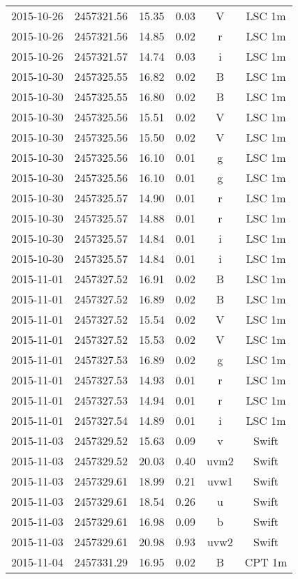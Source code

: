 \begin{table}
\begin{tabular}{cccccc}
2015-10-26 & 2457321.56 & 15.35 & 0.03 & V & LSC 1m \\
2015-10-26 & 2457321.56 & 14.85 & 0.02 & r & LSC 1m \\
2015-10-26 & 2457321.57 & 14.74 & 0.03 & i & LSC 1m \\
2015-10-30 & 2457325.55 & 16.82 & 0.02 & B & LSC 1m \\
2015-10-30 & 2457325.55 & 16.80 & 0.02 & B & LSC 1m \\
2015-10-30 & 2457325.56 & 15.51 & 0.02 & V & LSC 1m \\
2015-10-30 & 2457325.56 & 15.50 & 0.02 & V & LSC 1m \\
2015-10-30 & 2457325.56 & 16.10 & 0.01 & g & LSC 1m \\
2015-10-30 & 2457325.56 & 16.10 & 0.01 & g & LSC 1m \\
2015-10-30 & 2457325.57 & 14.90 & 0.01 & r & LSC 1m \\
2015-10-30 & 2457325.57 & 14.88 & 0.01 & r & LSC 1m \\
2015-10-30 & 2457325.57 & 14.84 & 0.01 & i & LSC 1m \\
2015-10-30 & 2457325.57 & 14.84 & 0.01 & i & LSC 1m \\
2015-11-01 & 2457327.52 & 16.91 & 0.02 & B & LSC 1m \\
2015-11-01 & 2457327.52 & 16.89 & 0.02 & B & LSC 1m \\
2015-11-01 & 2457327.52 & 15.54 & 0.02 & V & LSC 1m \\
2015-11-01 & 2457327.52 & 15.53 & 0.02 & V & LSC 1m \\
2015-11-01 & 2457327.53 & 16.89 & 0.02 & g & LSC 1m \\
2015-11-01 & 2457327.53 & 14.93 & 0.01 & r & LSC 1m \\
2015-11-01 & 2457327.53 & 14.94 & 0.01 & r & LSC 1m \\
2015-11-01 & 2457327.54 & 14.89 & 0.01 & i & LSC 1m \\
2015-11-03 & 2457329.52 & 15.63 & 0.09 & v & Swift \\
2015-11-03 & 2457329.52 & 20.03 & 0.40 & uvm2 & Swift \\
2015-11-03 & 2457329.61 & 18.99 & 0.21 & uvw1 & Swift \\
2015-11-03 & 2457329.61 & 18.54 & 0.26 & u & Swift \\
2015-11-03 & 2457329.61 & 16.98 & 0.09 & b & Swift \\
2015-11-03 & 2457329.61 & 20.98 & 0.93 & uvw2 & Swift \\
2015-11-04 & 2457331.29 & 16.95 & 0.02 & B & CPT 1m \\

\end{tabular}
\end{table}
